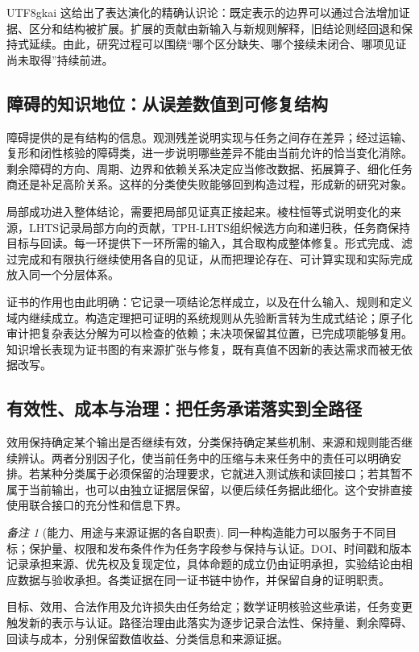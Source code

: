 \documentclass[11pt,a4paper]{article}
\theoremstyle{plain}
\theoremstyle{definition}
\theoremstyle{remark}
\newtheorem{remark}[theorem]{备注}
\begin{document}
\begin{CJK*}{UTF8}{gkai}
这给出了表达演化的精确认识论：既定表示的边界可以通过合法增加证据、区分和结构被扩展。扩展的贡献由新输入与新规则解释，旧结论则经回退和保持式延续。由此，研究过程可以围绕“哪个区分缺失、哪个接续未闭合、哪项见证尚未取得”持续前进。

\subsection{障碍的知识地位：从误差数值到可修复结构}

障碍提供的是有结构的信息。观测残差说明实现与任务之间存在差异；经过运输、复形和闭性核验的障碍类，进一步说明哪些差异不能由当前允许的恰当变化消除。剩余障碍的方向、周期、边界和依赖关系决定应当修改数据、拓展算子、细化任务商还是补足高阶关系。这样的分类使失败能够回到构造过程，形成新的研究对象。

局部成功进入整体结论，需要把局部见证真正接起来。棱柱恒等式说明变化的来源，LHTS记录局部方向的贡献，TPH-LHTS组织候选方向和递归秩，任务商保持目标与回读。每一环提供下一环所需的输入，其合取构成整体修复。形式完成、滤过完成和有限执行继续使用各自的见证，从而把理论存在、可计算实现和实际完成放入同一个分层体系。

证书的作用也由此明确：它记录一项结论怎样成立，以及在什么输入、规则和定义域内继续成立。构造定理把可证明的系统规则从先验断言转为生成式结论；原子化审计把复杂表达分解为可以检查的依赖；未决项保留其位置，已完成项能够复用。知识增长表现为证书图的有来源扩张与修复，既有真值不因新的表达需求而被无依据改写。

\subsection{有效性、成本与治理：把任务承诺落实到全路径}

效用保持确定某个输出是否继续有效，分类保持确定某些机制、来源和规则能否继续辨认。两者分别因子化，使当前任务中的压缩与未来任务中的责任可以明确安排。若某种分类属于必须保留的治理要求，它就进入测试族和读回接口；若其暂不属于当前输出，也可以由独立证据层保留，以便后续任务据此细化。这个安排直接使用联合接口的充分性和信息下界。

\begin{remark}[能力、用途与来源证据的各自职责]
同一种构造能力可以服务于不同目标；保护量、权限和发布条件作为任务字段参与保持与认证。DOI、时间戳和版本记录承担来源、优先权及复现定位，具体命题的成立仍由证明承担，实验结论由相应数据与验收承担。各类证据在同一证书链中协作，并保留自身的证明职责。\cite{S14,S16,S37,S38}
\end{remark}

目标、效用、合法作用及允许损失由任务给定；数学证明核验这些承诺，任务变更触发新的表示与认证。路径治理由此落实为逐步记录合法性、保持量、剩余障碍、回读与成本，分别保留数值收益、分类信息和来源证据。


\end{CJK*}
\end{document}
